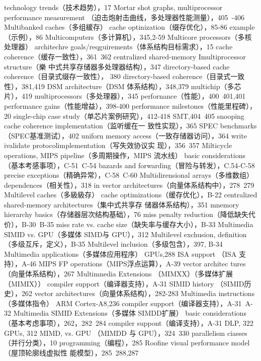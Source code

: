 technology trends（技术趋势），17
Mortar shot graphs, multiprocessor performance measurement
（迫击炮射击曲线，多处理器性能测量），405~-406
Multibanked caches（多组緩存）
cache optinization（缀存优化），85-86
example（示例），86
Multicomputers（多计算机），345,2-59
Multicore processors（多核处理器）
architechre goals/reqguirements（体系结构目标需求），15
cache coherence（缓存一致性），361~362
centralized shared-memory Imultiprocessor structure（樂
中式共享存储器多处理器结构），347
directory-based cache coherence（目录式缀存一致性），
380
directory-based coherence（目录式一致性），381,419
DSM architecture（DSM 体系结构），348,379
multichip（多芯片），419
multiprocessors（多处理器），345
perfornance（性能），400~401,401
performance gains（性能增益），398-400
performance milestones（性能里程碑），20
single-chip case study（单芯片案例研究），412-418
SMT,404~405
snooping cache coherence implementation（监听缓在一
致性实现），365
SPEC benchmarks（SPEC基准测试），402
uniforn memory access（一致存储器访问），364
write ivalidate protocolimplementation（写失效协议实
现），356~357
Milticycle operations, MIPS pipeline（多周期操作，MIPS
流水线）
basic considerations（基本考感事项），C-51~C-54
bazards and forwarding（冒险与转发），C.54-C-58
precise exceptions（精确异常），C-58~C-60
Multidirensional arrays（多维数组）
dependences（相关性），318
in vector architectures（向量体系结构中），278~279
Multilevel caches（多級級存）
cache optimizations（缓存优化），B-22
centralized shared-memory architectures（集中式共享存
储器体系结构），351
mnemory hierarchy basics（存储器层次结构基础），76
miss penalty reduction（降低缺失代价），B-30~B-35
miss rate vs. cache size（缺失率与缓存大小），B-33
Multimedia SIMID vs. GPU（多媒体 SIMD与 GPU），312
Multilevel exchusion, definition（多级互斥，定义），B-35
Multilevel inclusion（多级包含），397, B-34
Multimedia applications（多媒体应用程序）
GPUs,288
ISA support （ISA 支持），A-46
MIPS FP operations（MIPS浮点运算），A-39
vector architec tures（向量体系结构），267
Multimnedia Extensions （MIMXX）（多媒体扩展（MIMIX））
compiler support（编译器支持），A-31
SIMID history （SIMID历史），262
vector architectures（向量体系结构），282-283
Multimedia instructions（多媒体指令）
ARM Cortex-A8,236
compiler support（编译器支持），A-31~A-32
Multimedia SIMID Extensions（多媒体 SIMDD扩展）
basic considerations（基本考虑事项），262，282~284
compiler suppont（编译支持），A-31
DLP, 322
GPUs, 312
MIMD, vs. GPU （MIMDD 与 GPU），324~330
parallelism ciasses（并行分类），10
programming（编程），285
Roofine visual performance model（屋顶轮廓线虚拟性
能模型），285~288,287
